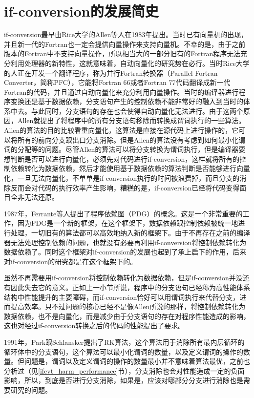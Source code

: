 \section{if-conversion的发展简史}

if-conversion最早由Rice大学的Allen等人在1983年提出\cite{allen1983Concondeptodatdep}。当时已有向量机的出现，并且新一代的Fortran也一定会提供向量操作来支持向量机。不幸的是，由于之前版本的Fortran中不支持向量操作，所以相当大的一部分旧有的Fortran程序无法充分利用处理器的新特性，这就意味着，自动向量化的研究势在必行。当时Rice大学的人正在开发一个翻译程序，称为并行Fortran转换器（Parallel Fortran Converter，简称PFC），它能将Fortran 66或者Fortran 77代码翻译成新一代Fortran的代码，并且通过自动向量化来充分利用向量操作。当时的编译器进行程序变换还是基于数据依赖，分支语句产生的控制依赖不能非常好的融入到当时的体系中去。与此同时，分支语句的存在也会使得自动向量化无法进行。由于这两个原因，Allen就提出了将程序中的所有分支语句移除而转换成谓词执行的一些算法。Allen的算法的目的比较看重向量化，这算法是直接在源代码上进行操作的，它可以将所有的前向分支跟出口分支消除。但是Allen的算法没有考虑到如何最小化谓词的分配等的问题。尽管Allen的算法可以将分支转换为谓词执行，但是编译器要想判断是否可以进行向量化，必须先对代码进行if-conversion，这样就将所有的控制依赖转化为数据依赖，然后才能使用基于数据依赖的算法判断是否能够进行向量化，一旦无法向量化，不单单是if-conversion执行的时间被浪费掉，而且分支的消除反而会对代码的执行效率产生影响，糟糕的是，if-conversion已经将代码变得面目全非无法还原。

1987年，Ferrante等人提出了程序依赖图（PDG）的概念\cite{ferrante1987prodepgraitsuseopt}。这是一个非常重要的工作，因为PDG是一个新的框架，在这个框架下，数据依赖跟控制依赖被统一地进行处理，一切旧有的算法都可以高效地纳入新的框架下。由于不再存在之前的编译器无法处理控制依赖的问题，也就没有必要再利用if-conversion将控制依赖转化为数据依赖了。同时这个框架对if-conversion的发展也起到了承上启下的作用，后来对if-conversion的研究都是在这个框架下的。

虽然不再需要用if-conversion将控制依赖转化为数据依赖，但是if-conversion并没还有因此失去它的意义。正如上一小节所说，程序中的分支语句已经称为高性能体系结构中性能提升的主要障碍，而if-conversion恰好可以用谓词执行来代替分支，进而提高效率。只不过问题的核心已经不是像Allen所说的那样，将控制依赖转化为数据依赖，也不是向量化，而是减少由于分支语句的存在对程序性能造成的影响，这也对经过if-conversion转换之后的代码的性能提出了要求。

1991年，Park跟Schlansker提出了RK算法\cite{JosephC.H.Park1991}，这个算法用于消除所有最内层循环的循环体中的分支语句，这个算法可以最小化谓词的数量，以及定义谓词的操作的数量。但问题是，谓词以及定义谓词的操作的数量最小并不意味着算法最优，之前也分析过（见\ref{ifcvt_harm_performance}节），分支消除也会对性能造成一定的负面影响，所以，到底是否进行分支消除，如果是，应该对哪部分分支进行消除也是需要研究的问题。

